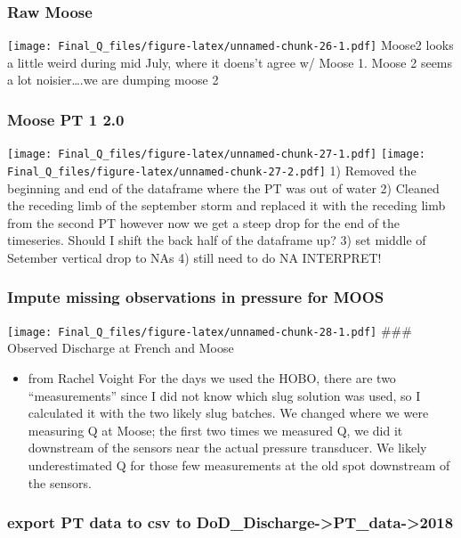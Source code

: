 \documentclass[
]{article}
\providecommand{\tightlist}{%
  \setlength{\itemsep}{0pt}\setlength{\parskip}{0pt}}
\begin{document}
\hypertarget{raw-moose-1}{%
\subsubsection{Raw Moose}\label{raw-moose-1}}

\texttt{[image: Final\_Q\_files/figure-latex/unnamed-chunk-26-1.pdf]}
Moose2 looks a little weird during mid July, where it doens't agree w/
Moose 1. Moose 2 seems a lot noisier\ldots.we are dumping moose 2

\hypertarget{moose-pt-1-2.0}{%
\subsubsection{Moose PT 1 2.0}\label{moose-pt-1-2.0}}

\texttt{[image: Final\_Q\_files/figure-latex/unnamed-chunk-27-1.pdf]}
\texttt{[image: Final\_Q\_files/figure-latex/unnamed-chunk-27-2.pdf]} 1)
Removed the beginning and end of the dataframe where the PT was out of
water 2) Cleaned the receding limb of the september storm and replaced
it with the receding limb from the second PT however now we get a steep
drop for the end of the timeseries. Should I shift the back half of the
dataframe up? 3) set middle of Setember vertical drop to NAs 4) still
need to do NA INTERPRET!

\hypertarget{impute-missing-observations-in-pressure-for-moos}{%
\subsubsection{Impute missing observations in pressure for
MOOS}\label{impute-missing-observations-in-pressure-for-moos}}

\texttt{[image: Final\_Q\_files/figure-latex/unnamed-chunk-28-1.pdf]}
\#\#\# Observed Discharge at French and Moose

\begin{itemize}
\tightlist
\item
  from Rachel Voight For the days we used the HOBO, there are two
  ``measurements'' since I did not know which slug solution was used, so
  I calculated it with the two likely slug batches. We changed where we
  were measuring Q at Moose; the first two times we measured Q, we did
  it downstream of the sensors near the actual pressure transducer. We
  likely underestimated Q for those few measurements at the old spot
  downstream of the sensors.
\end{itemize}

\hypertarget{export-pt-data-to-csv-to-dod_discharge-pt_data-2018-1}{%
\subsubsection{export PT data to csv to
DoD\_Discharge-\textgreater PT\_data-\textgreater2018}\label{export-pt-data-to-csv-to-dod_discharge-pt_data-2018-1}}
\end{document}
